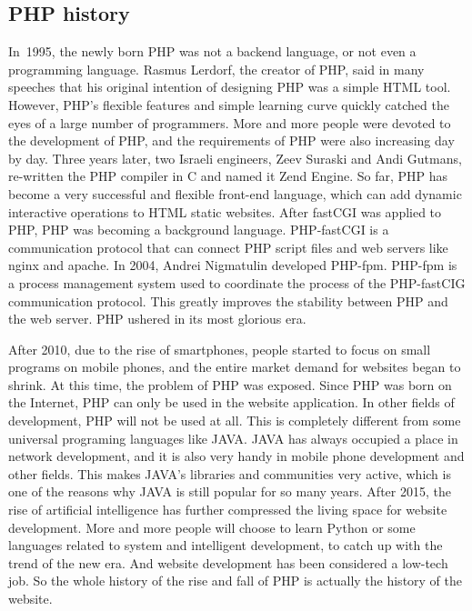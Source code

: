 \documentclass[12pt]{report}
\renewcommand{\_}{\kern-1.5pt\textunderscore\kern-1.5pt}
\begin{document}
\begin{multicols}{2}
\section{PHP history}
\setlength{\parskip}{6.0pt}
\begin{justify}
{\fontsize{10pt}{12.0pt}\selectfont In\ 1995, the newly born PHP was not a backend language, or not even a programming language. Rasmus Lerdorf, the creator of PHP, said in many speeches that his original intention of designing PHP was a simple HTML tool. However, PHP's flexible features and simple learning curve quickly catched the eyes of a large number of programmers. More and more people were devoted to the development of PHP, and the requirements of PHP were also increasing day by day. Three years later, two Israeli engineers, Zeev Suraski and Andi Gutmans, re-written the PHP compiler in C and named it Zend Engine. So far, PHP has become a very successful and flexible front-end language, which can add dynamic interactive operations to HTML static websites. After fastCGI was applied to PHP, PHP was becoming a background language. PHP-fastCGI is a communication protocol that can connect PHP script files and web servers like nginx and apache. In 2004, Andrei Nigmatulin developed PHP-fpm. PHP-fpm is a process management system used to coordinate the process of the PHP-fastCIG communication protocol. This greatly improves the stability between PHP and the web server. PHP ushered in its most glorious era.  \par}
\end{justify}
\begin{justify}
{\fontsize{10pt}{12.0pt}\selectfont After 2010, due to the rise of smartphones, people started to focus on small programs on mobile phones, and the entire market demand for websites began to shrink. At this time, the problem of PHP was exposed. Since PHP was born on the Internet, PHP can only be used in the website application. In other fields of development, PHP will not be used at all. This is completely different from some universal programing languages like JAVA. JAVA has always occupied a place in network development, and it is also very handy in mobile phone development and other fields. This makes JAVA's libraries and communities very active, which is one of the reasons why JAVA is still popular for so many years. After 2015, the rise of artificial intelligence has further compressed the living space for website development. More and more people will choose to learn Python or some languages related to system and intelligent development, to catch up with the trend of the new era. And website development has been considered a low-tech job. So the whole history of the rise and fall of PHP is actually the history of the website. \par}

\end{justify}
\end{multicols}
\end{document}
